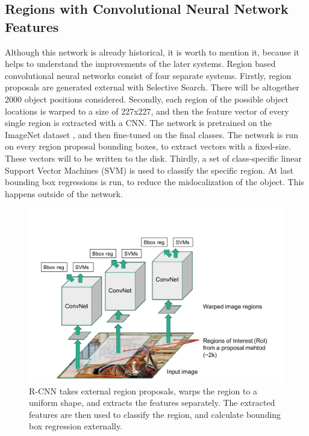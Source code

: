 \subsection{Regions with Convolutional Neural Network Features}
Although this network is already historical, it is worth to mention it, because it helps to understand the improvements of the later systems. Region based convolutional neural networks \cite{DBLP:journals/corr/GirshickDDM13} consist of four separate systems. Firstly, region proposals are generated external with Selective Search. There will be altogether 2000 object positions considered. Secondly, each region of the possible object locations is warped to a size of 227x227, and then the feature vector of every single region is extracted with a CNN. The network \cite{NIPS2012_4824} is pretrained on the ImageNet dataset \cite{imagenet_cvpr09}, and then fine-tuned on the final classes. The network is run on every region proposal bounding boxes, to extract vectors with a fixed-size. These vectors will to be written to the disk. Thirdly, a set of class-specific linear Support Vector Machines (SVM) \cite{Cortes:1995:SN:218919.218929} is used to classify the specific region. At last bounding box regressions is run, to reduce the mislocalization of the object. This happens outside of the network.
\bigbreak
\begin{figure}[h!]
	\centering
	\includegraphics[width=12cm]{images/mt/rcnn.png}
	\caption{R-CNN takes external region proposals, warps the region to a uniform shape, and extracts the features separately. The extracted features are then used to classify the region, and calculate bounding box regression externally.}
	\label{fig:rcnn}
\end{figure}
\bigbreak
